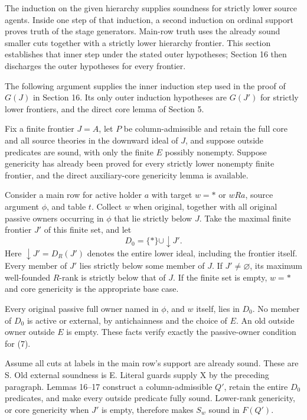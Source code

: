 \documentclass[
  11pt,
  letterpaper,
]{article}
\begin{document}
The induction on the given hierarchy supplies soundness for strictly
lower source agents. Inside one step of that induction, a second
induction on ordinal support proves truth of the stage generators.
Main-row truth uses the already sound smaller cuts together with a
strictly lower hierarchy frontier. This section establishes that inner
step under the stated outer hypotheses; Section 16 then discharges the
outer hypotheses for every frontier.

The following argument supplies the inner induction step used in the
proof of \(G(J)\) in Section 16. Its only outer induction hypotheses are
\(G(J')\) for strictly lower frontiers, and the direct core lemma of
Section 5.

Fix a finite frontier \(J=A\), let \(P\) be column-admissible and retain
the full core and all source theories in the downward ideal of \(J\),
and suppose outside predicates are sound, with only the finite \(E\)
possibly nonempty. Suppose genericity has already been proved for every
strictly lower nonempty finite frontier, and the direct auxiliary-core
genericity lemma is available.

Consider a main row for active holder \(a\) with target \(w=*\) or
\(wRa\), source argument \(\phi\), and table \(t\). Collect \(w\) when
original, together with all original passive owners occurring in
\(\phi\) that lie strictly below \(J\). Take the maximal finite frontier
\(J'\) of this finite set, and let \[
D_0=\{*\}\cup\downarrow J'.
\] Here \(\downarrow J'=D_R(J')\) denotes the entire lower ideal,
including the frontier itself. Every member of \(J'\) lies strictly
below some member of \(J\). If \(J'\ne\varnothing\), its maximum
well-founded \(R\)-rank is strictly below that of \(J\). If the finite
set is empty, \(w=*\) and core genericity is the appropriate base case.

Every original passive full owner named in \(\phi\), and \(w\) itself,
lies in \(D_0\). No member of \(D_0\) is active or external, by
antichainness and the choice of \(E\). An old outside owner outside
\(E\) is empty. These facts verify exactly the passive-owner condition
for (7).

Assume all cuts at labels in the main row's support are already sound.
These are S. Old external soundness is E. Literal guards supply X by the
preceding paragraph. Lemmas 16--17 construct a column-admissible \(Q'\),
retain the entire \(D_0\) predicates, and make every outside predicate
fully sound. Lower-rank genericity, or core genericity when \(J'\) is
empty, therefore makes \(S_w\) sound in \(F(Q')\).
\end{document}
